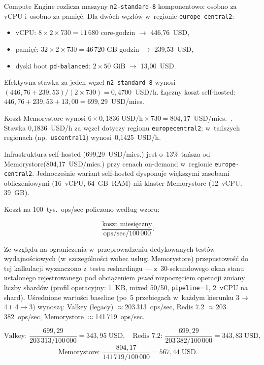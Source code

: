 \FloatBarrier

Compute Engine rozlicza maszyny \texttt{n2-standard-8} komponentowo: osobno za vCPU i~osobno za pamięć. Dla dwóch węzłów w~regionie \texttt{europe-central2}:

\begin{itemize}
\item vCPU: $8 \times 2 \times 730 = 11\,680$ core-godzin $\rightarrow$ 446{,}76~USD,
\item pamięć: $32 \times 2 \times 730 = 46\,720$ GB-godzin $\rightarrow$ 239{,}53~USD,
\item dyski boot \texttt{pd-balanced}: $2 \times 50$ GiB $\rightarrow$ 13{,}00~USD.
\end{itemize}

Efektywna stawka za jeden węzeł \texttt{n2-standard-8} wynosi $(446{,}76 + 239{,}53) / (2 \times 730) = 0{,}4700$~USD/h. Łączny koszt self-hosted: $446{,}76 + 239{,}53 + 13{,}00 = 699{,}29$~USD/mies.

Koszt Memorystore wynosi $6 \times 0{,}1836\;\text{USD/h} \times 730 = 804{,}17$~USD/mies.~\cite{gcpMemorystorePricing}. Stawka 0{,}1836~USD/h za węzeł dotyczy regionu \texttt{europe\-central2}; w~tańszych regionach (np.~\texttt{us\-central1}) wynosi~0{,}1425~USD/h.

Infrastruktura self-hosted (699{,}29~USD/mies.) jest o~13\% tańsza od Memorystore\linebreak (804{,}17~USD/mies.) przy cenach on-demand w~regionie \texttt{europe-central2}. Jednocześnie wariant self-hosted dysponuje większymi zasobami obliczeniowymi (16~vCPU, 64~GB~RAM) niż klaster Memorystore (12~vCPU, 39~GB).

Koszt na 100~tys.\ ops/sec policzono według wzoru:

\[
\frac{\text{koszt miesięczny}}{\text{ops/sec} / 100\,000}.
\]

Ze względu na ograniczenia w~przeprowadzeniu dedykowanych testów wydajnościowych (w~szczególności wobec usługi Memorystore) przepustowość do tej kalkulacji wyznaczono z~testu reshardingu --- z~30-sekundowego okna stanu ustalonego rejestrowanego pod obciążeniem \emph{przed} rozpoczęciem operacji zmiany liczby shardów (profil operacyjny: 1~KB, mixed 50/50, \texttt{pipeline}=1, 2~vCPU na shard). Uśrednione wartości baseline (po~5 przebiegach w~każdym kierunku 3$\to$4 i~4$\to$3) wynoszą: Valkey (legacy) $\approx$203\,313~ops/sec, Redis 7.2 $\approx$203\,382~ops/sec, Memorystore $\approx$141\,719~ops/sec.

\[
\text{Valkey: } \frac{699{,}29}{203\,313 / 100\,000} = 343{,}95\;\text{USD},
\quad
\text{Redis 7.2: } \frac{699{,}29}{203\,382 / 100\,000} = 343{,}83\;\text{USD},
\]
\[
\text{Memorystore: } \frac{804{,}17}{141\,719 / 100\,000} = 567{,}44\;\text{USD}.
\]

